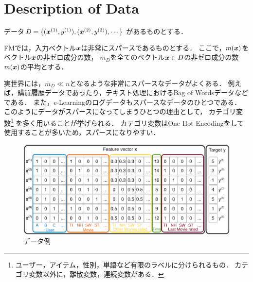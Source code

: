 \section{Description of Data}
データ$D = \{ ( \mbox{\boldmath $x$}^{(1)}, y^{(1)} ), ( \mbox{\boldmath $x$}^{(2)}, y^{(2)} ), \cdots  \}$
があるものとする．

FMでは，入力ベクトル$\mbox{\boldmath $x$}$は非常にスパースであるものとする．
ここで，$m(\mbox{\boldmath $x$})$をベクトル$\mbox{\boldmath $x$}$の非ゼロ成分の数，
$\overline{m}_{D}$を全てのベクトル$\mbox{\boldmath $x$} \in D$の非ゼロ成分の数$m(\mbox{\boldmath $x$})$の平均とする．

実世界には，$\overline{m}_{D} \ll n$となるような非常にスパースなデータがよくある．
例えば，購買履歴データであったり，テキスト処理におけるBag of Wordsデータなどである．
また，e-Learningのログデータもスパースなデータのひとつである．
このようにデータがスパースになってしまうひとつの理由として，
カテゴリ変数\footnote{ユーザー，アイテム，性別，単語など有限のラベルに分けられるもの．
カテゴリ変数以外に，離散変数，連続変数がある．}
を多く用いることが挙げられる．
カテゴリ変数はOne-Hot Encodingをして使用することが多いため，スパースになりやすい．
\begin{figure}[H]
  \centering
  \includegraphics[width=0.85\hsize, bb=0 0 1640 720]{fig/FM_data.png}
  \caption{データ例}
  \label{fig:data}
\end{figure}
